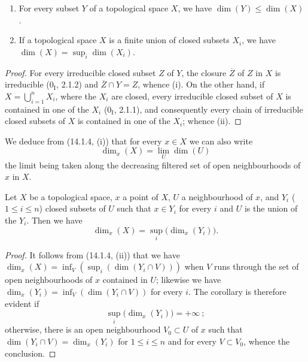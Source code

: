 \begin{proposition}[14.1.4]
\label{0.14.1.4}
\begin{enumerate}
  \item[\rm(i)] For every subset $Y$ of a topological space $X$, we have
  $\dim(Y)\leq\dim(X)$.
  \item[\rm(ii)] If a topological space $X$ is a finite union of closed
  subsets $X_i$, we have $\dim(X)=\sup_i\dim(X_i)$.
\end{enumerate}
\end{proposition}

\begin{proof}
For every irreducible closed subset $Z$ of $Y$, the closure $\overline Z$ of
$Z$ in $X$ is irreducible ($0_{\mathrm I}$, 2.1.2) and
$\overline Z\cap Y=Z$, whence (i). On the other hand, if
$X=\bigcup_{i=1}^n X_i$, where the $X_i$ are closed, every irreducible closed
subset of $X$ is contained in one of the $X_i$ ($0_{\mathrm I}$, 2.1.1),
and consequently every chain of irreducible closed subsets of $X$ is contained
in one of the $X_i$; whence (ii).
\end{proof}

We deduce from (14.1.4, (i)) that for every $x\in X$ we can also write
\[
  \dim_x(X)=\lim_U\dim(U)
  \tag{14.1.4.1}\label{0.14.1.4.1}
\]
the limit being taken along the decreasing filtered set of open
neighbourhoods of $x$ in $X$.

\begin{corollary}[14.1.5]
\label{0.14.1.5}
Let $X$ be a topological space, $x$ a point of $X$, $U$ a neighbourhood of
$x$, and $Y_i$ ($1\leq i\leq n$) closed subsets of $U$ such that
$x\in Y_i$ for every $i$ and $U$ is the union of the $Y_i$. Then we have
\[
  \dim_x(X)=\sup_i\bigl(\dim_x(Y_i)\bigr).
  \tag{14.1.5.1}\label{0.14.1.5.1}
\]
\end{corollary}

\begin{proof}
It follows from (14.1.4, (ii)) that we have
$\dim_x(X)=\inf_V(\sup_i(\dim(Y_i\cap V)))$ when $V$ runs through the set
of open neighbourhoods of $x$ contained in $U$; likewise we have
$\dim_x(Y_i)=\inf_V(\dim(Y_i\cap V))$ for every $i$. The corollary is therefore
evident if
\[
  \sup_i\bigl(\dim_x(Y_i)\bigr)=+\infty~;
\]
otherwise, there is an open neighbourhood $V_0\subset U$ of $x$ such
that $\dim(Y_i\cap V)=\dim_x(Y_i)$ for $1\leq i\leq n$ and for every
$V\subset V_0$, whence the conclusion.
\end{proof}

